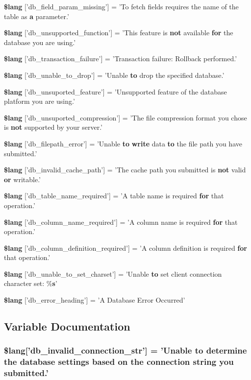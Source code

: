 \begin{DoxyCompactItemize}
{\bf \$lang} ['db\-\_\-field\-\_\-param\-\_\-missing'] = 'To fetch fields requires the name of the table as {\bf a} parameter.'
\item 
{\bf \$lang} ['db\-\_\-unsupported\-\_\-function'] = 'This feature is {\bf not} available {\bf for} the database you are using.'
\item 
{\bf \$lang} ['db\-\_\-transaction\-\_\-failure'] = 'Transaction failure\-: Rollback performed.'
\item 
{\bf \$lang} ['db\-\_\-unable\-\_\-to\-\_\-drop'] = 'Unable {\bf to} drop the specified database.'
\item 
{\bf \$lang} ['db\-\_\-unsuported\-\_\-feature'] = 'Unsupported feature of the database platform you are using.'
\item 
{\bf \$lang} ['db\-\_\-unsuported\-\_\-compression'] = 'The file compression format you chose is {\bf not} supported by your server.'
\item 
{\bf \$lang} ['db\-\_\-filepath\-\_\-error'] = 'Unable {\bf to} {\bf write} data {\bf to} the file path you have submitted.'
\item 
{\bf \$lang} ['db\-\_\-invalid\-\_\-cache\-\_\-path'] = 'The cache path you submitted is {\bf not} valid {\bf or} writable.'
\item 
{\bf \$lang} ['db\-\_\-table\-\_\-name\-\_\-required'] = 'A table name is required {\bf for} that operation.'
\item 
{\bf \$lang} ['db\-\_\-column\-\_\-name\-\_\-required'] = 'A column name is required {\bf for} that operation.'
\item 
{\bf \$lang} ['db\-\_\-column\-\_\-definition\-\_\-required'] = 'A column definition is required {\bf for} that operation.'
\item 
{\bf \$lang} ['db\-\_\-unable\-\_\-to\-\_\-set\-\_\-charset'] = 'Unable {\bf to} set client connection character set\-: \%{\bf s}'
\item 
{\bf \$lang} ['db\-\_\-error\-\_\-heading'] = 'A Database Error Occurred'
\end{DoxyCompactItemize}


\subsection{Variable Documentation}
\subsubsection[{\$lang}]{\setlength{\rightskip}{0pt plus 5cm}\$lang['db\-\_\-invalid\-\_\-connection\-\_\-str'] = 'Unable {\bf to} determine the database settings based on the connection string you submitted.'}\label{db__lang_8php_a0c2ed2613101d37cbaba14042530c16d}


